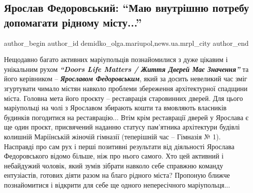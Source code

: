  
 
 
 
 
 
\subsection{Ярослав Федоровський: \enquote{Маю внутрішню потребу допомагати рідному місту...}}
\label{sec:25_06_2021.stz.news.ua.mrpl_city.1.jaroslav_fedorovskij}
 
\ifcmt
 author_begin
   author_id demidko_olga.mariupol,news.ua.mrpl_city
 author_end
\fi


Нещодавно багато активних  маріупольців познайомилися з дуже цікавим і
унікальним рухом  \emph{\textbf{\enquote{Doors Life Matters / Життя Дверей Має Значення}}} та його
керівником – \emph{\textbf{Ярославом Федоровським}}, який за досить невеликий час зміг
згуртувати чимало містян навколо проблеми збереження архітектурної спадщини
міста. Головна мета його проєкту – реставрація старовинних дверей. Для цього
маріупольці на чолі з Ярославом збирають кошти та вмовляють власників будинків
погодитися на реставрацію... Втім крім реставрації дверей у Ярослава є ще один
проєкт, присвячений наданню статусу пам'ятника архітектури будівлі колишній
Маріїнській жіночій гімназії (теперішній час – Гімназія № 1).  Насправді про
сам рух і перші позитивні результати від діяльності Ярослава Федоровського
відомо більше, ніж про нього самого. Хто цей активний і небайдужий чоловік,
який зумів зібрати навколо себе справжню команду ентузіастів, готових діяти
разом на благо рідного міста? Пропоную ближче познайомитися і відкрити для себе
ще одного непересічного маріупольця...

